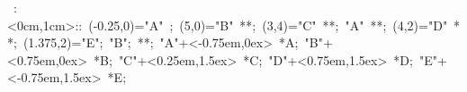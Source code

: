 
\hbox{
\xy    <1cm,0cm>:<0cm,1cm>::
       (-0.25,0)="A" ; (5,0)="B" **\dir{-}; 
       (3,4)="C" **\dir{-}; "A" **\dir{-};
       (4,2)="D" **\dir{-}; (1.375,2)="E"; "B"; **\dir{-};
       "A"+<-0.75em,0ex> *{A};
       "B"+<0.75em,0ex> *{B};
       "C"+<0.25em,1.5ex> *{C};
       "D"+<0.75em,1.5ex> *{D};
       "E"+<-0.75em,1.5ex> *{E};
       \endxy}
	   

